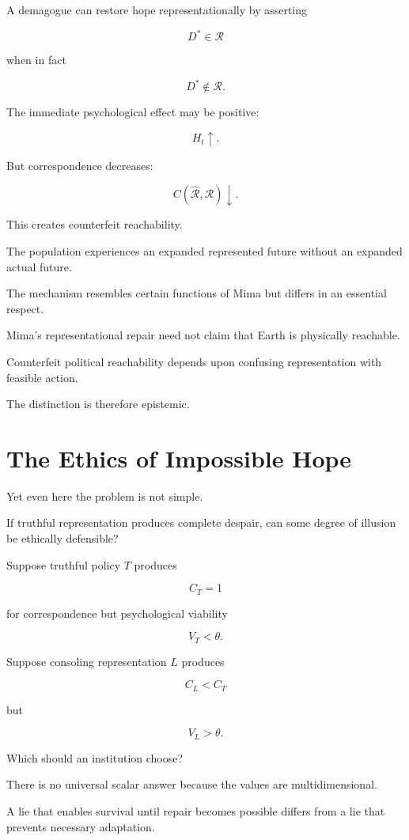 \documentclass[11pt,oneside]{book}
\theoremstyle{definition}
\theoremstyle{remark}
\newcommand{\R}{\mathcal{R}}
\begin{document}
A demagogue can restore hope representationally by asserting

\[
D^\ast\in\R
\]

when in fact

\[
D^\ast\notin\R.
\]

The immediate psychological effect may be positive:

\[
H_t\uparrow.
\]

But correspondence decreases:

\[
C(\widehat{\R},\R)\downarrow.
\]

This creates counterfeit reachability.

The population experiences an expanded represented future without an expanded actual future.

The mechanism resembles certain functions of Mima but differs in an essential respect.

Mima's representational repair need not claim that Earth is physically reachable.

Counterfeit political reachability depends upon confusing representation with feasible action.

The distinction is therefore epistemic.

\section{The Ethics of Impossible Hope}

Yet even here the problem is not simple.

If truthful representation produces complete despair, can some degree of illusion be ethically defensible?

Suppose truthful policy \(T\) produces

\[
C_T=1
\]

for correspondence but psychological viability

\[
V_T<\theta.
\]

Suppose consoling representation \(L\) produces

\[
C_L<C_T
\]

but

\[
V_L>\theta.
\]

Which should an institution choose?

There is no universal scalar answer because the values are multidimensional.

A lie that enables survival until repair becomes possible differs from a lie that prevents necessary adaptation.
\end{document}
